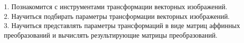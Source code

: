 1. Познакомится с инструментами трансформации векторных изображений.\\


2. Научиться подбирать параметры трансформации векторных изображений.\\


3. Научиться представлять параметры трансформаций в виде матриц аффинных
преобразований и вычислять результирующие матрицы преобразований.
